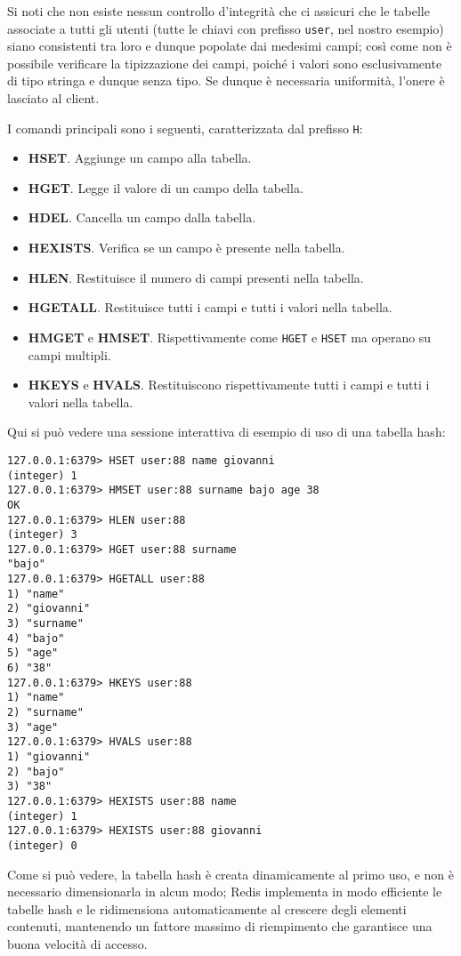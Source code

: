 Si noti che non esiste nessun controllo d'integrità che ci assicuri che le tabelle associate a tutti
gli utenti (tutte le chiavi con prefisso \verb|user|, nel nostro esempio) siano consistenti tra loro
e dunque popolate dai medesimi campi; così come non è possibile verificare la tipizzazione dei
campi, poiché i valori sono esclusivamente di tipo stringa e dunque senza tipo. Se dunque è
necessaria uniformità, l'onere è lasciato al client.

I comandi principali sono i seguenti, caratterizzata dal prefisso \verb|H|:

\begin{itemize}
	\medskip
	\item \textbf{HSET}. Aggiunge un campo alla tabella.
	\item \textbf{HGET}. Legge il valore di un campo della tabella.
	\item \textbf{HDEL}. Cancella un campo dalla tabella.
	\item \textbf{HEXISTS}. Verifica se un campo è presente nella tabella.
	\item \textbf{HLEN}. Restituisce il numero di campi presenti nella tabella.
	\item \textbf{HGETALL}. Restituisce tutti i campi e tutti i valori nella tabella.
	\item \textbf{HMGET} e \textbf{HMSET}. Rispettivamente come \verb|HGET| e \verb|HSET| ma operano
	su campi multipli.
	\item \textbf{HKEYS} e \textbf{HVALS}. Restituiscono rispettivamente tutti i campi e tutti i
	valori nella tabella.
\end{itemize}

Qui si può vedere una sessione interattiva di esempio di uso di una tabella hash:

\medskip
\begin{lstlisting}
127.0.0.1:6379> HSET user:88 name giovanni
(integer) 1
127.0.0.1:6379> HMSET user:88 surname bajo age 38
OK
127.0.0.1:6379> HLEN user:88
(integer) 3
127.0.0.1:6379> HGET user:88 surname
"bajo"
127.0.0.1:6379> HGETALL user:88
1) "name"
2) "giovanni"
3) "surname"
4) "bajo"
5) "age"
6) "38"
127.0.0.1:6379> HKEYS user:88
1) "name"
2) "surname"
3) "age"
127.0.0.1:6379> HVALS user:88
1) "giovanni"
2) "bajo"
3) "38"
127.0.0.1:6379> HEXISTS user:88 name
(integer) 1
127.0.0.1:6379> HEXISTS user:88 giovanni
(integer) 0
\end{lstlisting}

Come si può vedere, la tabella hash è creata dinamicamente al primo uso, e non è necessario
dimensionarla in alcun modo; Redis implementa in modo efficiente le tabelle hash e le ridimensiona
automaticamente al crescere degli elementi contenuti, mantenendo un fattore massimo di riempimento
che garantisce una buona velocità di accesso.

